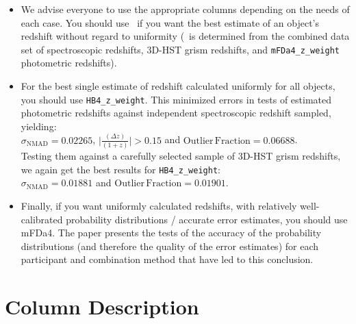 \begin{itemize}
\item We advise everyone to use the appropriate columns depending on the needs of each case. You should use \zbest\ if you want the best estimate of an object's redshift without regard to uniformity (\zbest\ is determined from the combined data set of spectroscopic redshifts, 3D-HST grism redshifts, and \texttt{mFDa4\_z\_weight} photometric redshifts).

\item For the best single estimate of redshift calculated uniformly for all objects, you should use \texttt{HB4\_z\_weight}.  This minimized errors in tests of estimated photometric redshifts against independent spectroscopic redshift sampled, yielding:\\
\-\hspace{1cm} $\sigma_\mathrm{NMAD} = 0.02265$, $\lvert \frac{(\Delta z)}{(1+z)} \rvert > 0.15$ and $\mathrm{Outlier \, Fraction} = 0.06688$.\\
Testing them against a carefully selected sample of 3D-HST grism redshifts, we again get the best results for \texttt{HB4\_z\_weight}:\\
\-\hspace{1cm} $\sigma_\mathrm{NMAD} = 0.01881$ and $\mathrm{Outlier \, Fraction} = 0.01901$.

\item Finally, if you want uniformly calculated redshifts, with relatively well-calibrated probability distributions / accurate error estimates, you should use mFDa4.  The paper presents the tests of the accuracy of the probability distributions (and therefore the quality of the error estimates) for each participant and combination method that have led to this conclusion.

\end{itemize}


\section*{Column Description}

